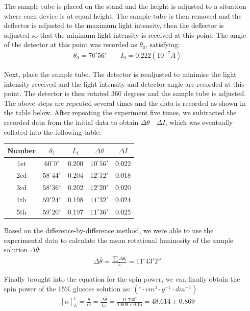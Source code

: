 \documentclass[UTF8]{article}
\begin{document}
The sample tube is placed on the stand and the height is adjusted to a situation where each device is at equal height. The sample tube is then removed and the deflector is adjusted to the maximum light intensity, then the deflector is adjusted so that the minimum light intensity is received at this point. The angle of the detector at this point was recorded as $\theta _{0} $, satisfying:
\begin{eqnarray}\theta _{0} = 70^{\circ}{56}'  \qquad  I_{0}=0.222\left ( 10^{-7} A \right )  \end{eqnarray}

Next, place the sample tube. The detector is readjusted to minimise the light intensity received and the light intensity and detector angle are recorded at this point. The detector is then rotated 360 degrees and the sample tube is adjusted. The above steps are repeated several times and the data is recorded as shown in the table below. After repeating the experiment five times, we subtracted the recorded data from the initial data to obtain $\Delta \theta \quad \Delta I$, which was eventually collated into the following table:
	\begin{center}
	\begin{tabular}{ccccc}
		\toprule
		Number & $\theta _{i} $ & $L _{i} $ & $\Delta \theta $ & $\Delta I$\\
		\midrule
		1st & $60^{\circ} {0}' $ & 0.200 & $10^{\circ} {56}' $ & 0.022\\
		2ed & $58^{\circ} {44}' $ & 0.204 & $12^{\circ} {12}' $ & 0.018\\
		3rd & $58^{\circ} {36}' $ & 0.202 & $12^{\circ} {20}' $ & 0.020\\
		4th & $59^{\circ} {24}' $ & 0.198 & $11^{\circ} {32}' $ & 0.024\\
		5th & $59^{\circ} {20}' $ & 0.197 & $11^{\circ} {36}' $ & 0.025\\
		\bottomrule
	\end{tabular}
\end{center}

Based on the difference-by-difference method, we were able to use the experimental data to calculate the mean rotational luminosity of the sample solution $\Delta \bar{\theta } $:
\begin{eqnarray}\Delta \bar{\theta } =\frac{\sum \Delta \theta _{i} }{5} =11 ^{\circ} {43}'{2}'' \end{eqnarray}

Finally brought into the equation for the spin power, we can finally obtain the spin power of the 15\% glucose solution as:   $ \left ( ^{\circ} \cdot cm^{3} \cdot g^{-1} \cdot dm^{-1} \right ) $
\begin{eqnarray}\left [ \alpha  \right ] _{L}^{t}=\frac{\theta }{lc}=\frac{\Delta \bar{\theta } }{\bar{L}c } =\frac{11.733^{\circ} }{1.609\times 0.15}=48.614\pm 0.869   \end{eqnarray}
\end{document}
